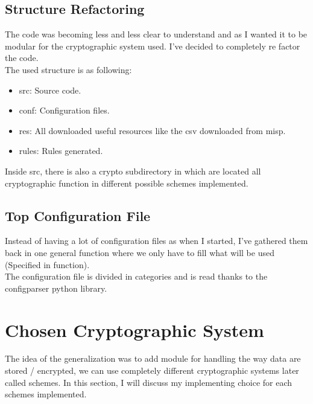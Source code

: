 \documentclass{eplmastersthesis}
\begin{document}
\subsection{Structure Refactoring}
The code was becoming less and less clear to understand and as I wanted it to be modular for the cryptographic system used. I've decided to completely re factor the code.\\
The used structure is as following:
\begin{itemize}
\item src: Source code.
\item conf: Configuration files.
\item res: All downloaded useful resources like the csv downloaded from misp.
\item rules: Rules generated.
\end{itemize}

Inside src, there is also a crypto subdirectory in which are located all cryptographic function in different possible schemes implemented.

\subsection{Top Configuration File}
Instead of having a lot of configuration files as when I started, I've gathered them back in one general function where we only have to fill what will be used (Specified in function).\\
The configuration file is divided in categories and is read thanks to the configparser python library.

\section{Chosen Cryptographic System}
The idea of the generalization was to add module for handling the way data are stored / encrypted, we can use completely different cryptographic systems later called schemes. In this section, I will discuss my implementing choice for each schemes implemented.
\end{document}
